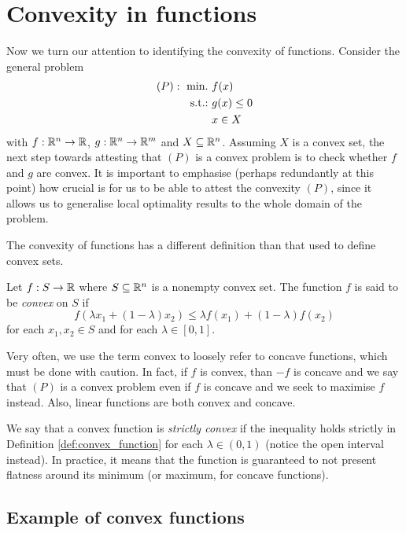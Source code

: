 \section{Convexity in functions}

Now we turn our attention to identifying the convexity of functions. Consider the general problem
%
\begin{align*}
	(P) :~ \mathop{\text{min.~}} & f(x) \\
	\mathop{\text{s.t.:~}}          & g(x) \leq 0 \\
    	         & x \in X  
\end{align*}
% 
with $f:\mathbb{R}^n \to \mathbb{R}$, $g: \mathbb{R}^n \to \mathbb{R}^m$ and $X \subseteq \mathbb{R}^n$. Assuming $X$ is a convex set, the next step towards attesting that $(P)$ is a convex problem is to check whether $f$ and $g$ are convex. It is important to emphasise (perhaps redundantly at this point) how crucial is for us to be able to attest the convexity $(P)$, since it allows us to generalise local optimality results to the whole domain of the problem.

The convexity of functions has a different definition than that used to define convex sets.
%
\begin{definition}\label{def:convex_function}
	Let $f:S \to \mathbb{R}$ where $S \subseteq \mathbb{R}^n$ is a nonempty convex set. The function $f$ is said to be \emph{convex} on $S$ if
	$$ f(\lambda x_1 + (1-\lambda)x_2) \leq \lambda f(x_1) + (1-\lambda)f(x_2)
	$$
	for each $x_1, x_2 \in S$ and for each $\lambda \in [0,1]$.
\end{definition}
%
Very often, we use the term convex to loosely refer to  concave functions, which must be done with caution. In fact, if $f$ is convex, than $-f$ is concave and we say that $(P)$ is a convex problem even if $f$ is concave and we seek to maximise $f$ instead. Also, linear functions are both convex and concave. 

We say that a convex function is \emph{strictly convex} if the inequality holds strictly in Definition \ref{def:convex_function} for each $\lambda \in (0,1)$ (notice the open interval instead). In practice, it means that the function is guaranteed to not present flatness around its minimum (or maximum, for concave functions).

\subsection{Example of convex functions}


